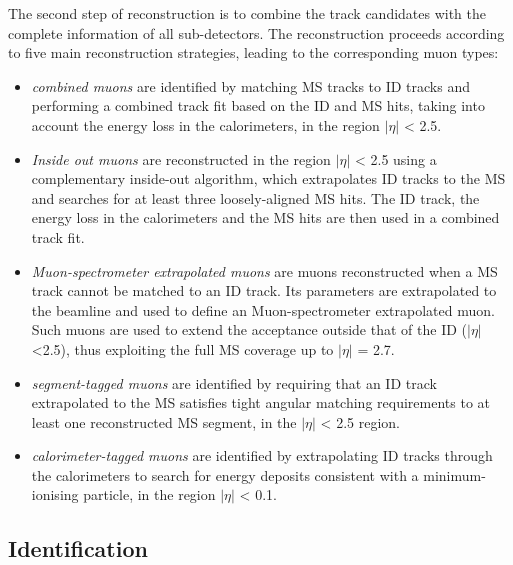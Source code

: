The second step of reconstruction is to combine the track candidates 
with the complete information of all sub-detectors.
The reconstruction proceeds according to five main
reconstruction strategies, leading to the corresponding muon
types: 
\begin{itemize}
\item \textit{combined muons} 
are identified by matching 
MS tracks to ID tracks and performing a combined track fit 
based on the ID and MS hits, taking into account the energy loss in the
calorimeters, in the region $|\eta|$ < 2.5.
\item \textit{Inside out muons} 
are reconstructed in the region $|\eta|$ < 2.5 using a complementary
inside-out algorithm, which extrapolates ID tracks to the MS
and searches for at least three loosely-aligned MS hits. The
ID track, the energy loss in the calorimeters and the MS hits
are then used in a combined track fit. 
\item \textit{Muon-spectrometer extrapolated muons} are muons 
reconstructed when a MS track cannot be matched to an ID track. 
Its parameters are extrapolated to the beamline and used to define an
Muon-spectrometer extrapolated muon. 
Such muons are used to extend the acceptance
outside that of the ID ($|\eta|$ <2.5), thus exploiting the full MS 
coverage up to $|\eta|$ = 2.7.
\item \textit{segment-tagged muons} 
are identified by requiring that an ID track
extrapolated to the MS satisfies tight angular matching
requirements to at least one reconstructed MS segment, 
in the $|\eta|$ < 2.5 region. 
\item \textit{calorimeter-tagged muons} 
are identified by extrapolating ID
tracks through the calorimeters to search for energy deposits
consistent with a minimum-ionising particle, in the region $|\eta|$ < 0.1.
\end{itemize}
\subsection{Identification}


